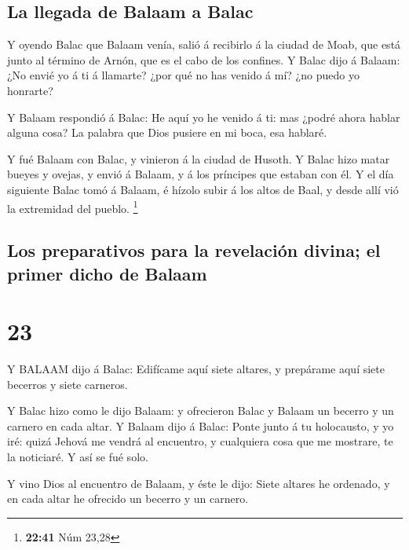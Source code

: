 \hypertarget{la-llegada-de-balaam-a-balac}{%
\subsection{La llegada de Balaam a
Balac}\label{la-llegada-de-balaam-a-balac}}

 Y oyendo Balac que Balaam venía, salió á recibirlo á la
ciudad de Moab, que está junto al término de Arnón, que es el cabo de
los confines.  Y Balac dijo á Balaam: ¿No envié yo á ti á
llamarte? ¿por qué no has venido á mí? ¿no puedo yo honrarte?

 Y Balaam respondió á Balac: He aquí yo he venido á ti: mas
¿podré ahora hablar alguna cosa? La palabra que Dios pusiere en mi boca,
esa hablaré.

 Y fué Balaam con Balac, y vinieron á la ciudad de Husoth.
 Y Balac hizo matar bueyes y ovejas, y envió á Balaam, y á
los príncipes que estaban con él.  Y el día siguiente Balac
tomó á Balaam, é hízolo subir á los altos de Baal, y desde allí vió la
extremidad del pueblo. \footnote{\textbf{22:41} Núm 23,28}

\hypertarget{los-preparativos-para-la-revelaciuxf3n-divina-el-primer-dicho-de-balaam}{%
\subsection{Los preparativos para la revelación divina; el primer dicho
de
Balaam}\label{los-preparativos-para-la-revelaciuxf3n-divina-el-primer-dicho-de-balaam}}

\hypertarget{section-22}{%
\section{23}\label{section-22}}

 Y BALAAM dijo á Balac: Edifícame aquí siete altares, y
prepárame aquí siete becerros y siete carneros.

 Y Balac hizo como le dijo Balaam: y ofrecieron Balac y
Balaam un becerro y un carnero en cada altar.  Y Balaam dijo
á Balac: Ponte junto á tu holocausto, y yo iré: quizá Jehová me vendrá
al encuentro, y cualquiera cosa que me mostrare, te la noticiaré. Y así
se fué solo.

 Y vino Dios al encuentro de Balaam, y éste le dijo: Siete
altares he ordenado, y en cada altar he ofrecido un becerro y un
carnero.

